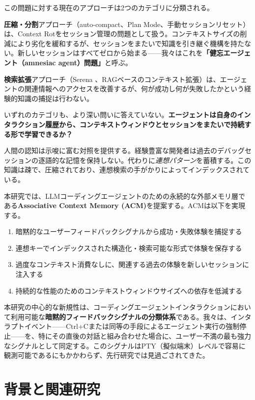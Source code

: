 \documentclass[conference]{IEEEtran}
\begin{document}
この問題に対する現在のアプローチは2つのカテゴリに分類される。

\textbf{圧縮・分割}アプローチ（auto-compact、Plan Mode、手動セッションリセット）は、Context Rotをセッション管理の問題として扱う。コンテキストサイズの削減により劣化を緩和するが、セッションをまたいで知識を引き継ぐ機構を持たない。新しいセッションはすべてゼロから始まる——我々はこれを\textbf{「健忘エージェント（amnesiac agent）問題」}と呼ぶ。

\textbf{検索拡張}アプローチ（Serena \cite{OraiosAI2025Serena}、RAGベースのコンテキスト拡張）は、エージェントの関連情報へのアクセスを改善するが、何が成功し何が失敗したかという経験的知識の捕捉は行わない。

いずれのカテゴリも、より深い問いに答えていない。\textbf{エージェントは自身のインタラクション履歴から、コンテキストウィンドウとセッションをまたいで持続する形で学習できるか？}

人間の認知は示唆に富む対照を提供する。経験豊富な開発者は過去のデバッグセッションの逐語的な記憶を保持しない。代わりに\emph{連想パターン}を蓄積する。この知識は疎で、圧縮されており、連想検索の手がかりによってインデックスされている。

本研究では、LLMコーディングエージェントのための永続的な外部メモリ層である\textbf{Associative Context Memory (ACM)}を提案する。ACMは以下を実現する。

\begin{enumerate}
\item 暗黙的なユーザーフィードバックシグナルから成功・失敗体験を捕捉する
\item 連想キーでインデックスされた構造化・検索可能な形式で体験を保存する
\item 過度なコンテキスト消費なしに、関連する過去の体験を新しいセッションに注入する
\item 持続的な性能のためのコンテキストウィンドウサイズへの依存を低減する
\end{enumerate}

本研究の中心的な新規性は、コーディングエージェントインタラクションにおいて利用可能な\textbf{暗黙的フィードバックシグナルの分類体系}である。我々は、インタラプトイベント——Ctrl+Cまたは同等の手段によるエージェント実行の強制停止——を、特にその直後の対話と組み合わせた場合に、ユーザー不満の最も強力なシグナルとして同定する。このシグナルはPTY（擬似端末）レベルで容易に観測可能であるにもかかわらず、先行研究では見過ごされてきた。

\section{背景と関連研究}
\end{document}

